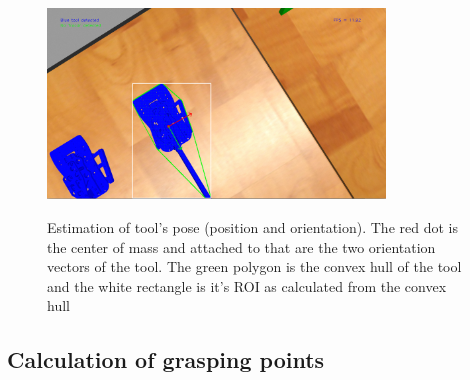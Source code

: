 \begin{center}
\begin{figure}[H]
\centering
\includegraphics[width=0.8\textwidth]{images/tool-pose.png}\\
\caption{Estimation of tool's pose (position and orientation). The red dot is the center of mass and attached to that are the two orientation vectors of the tool. The green polygon is the convex hull of the tool 
and the white rectangle is it's ROI as calculated from the convex hull}
\end{figure}
\end{center}

\subsection{Calculation of grasping points}

